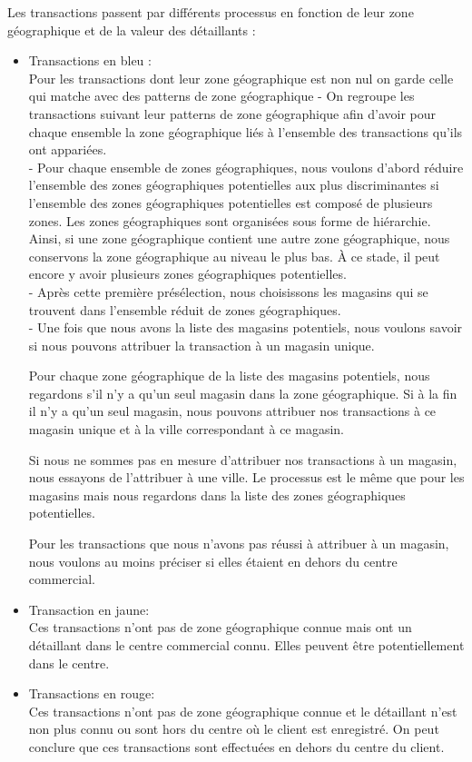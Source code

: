 \begin{itemize}
 Les transactions passent par différents processus en fonction de leur zone géographique et de la valeur des détaillants :
\begin{itemize}
\item Transactions en bleu : \\
Pour les transactions dont leur zone géographique est non nul on garde celle qui matche avec des patterns de zone géographique 
    - On regroupe les transactions suivant leur patterns de zone géographique afin d'avoir pour chaque ensemble la zone géographique liés à l'ensemble des transactions qu'ils ont appariées.\\
    - Pour chaque ensemble de zones géographiques, nous voulons d'abord réduire l'ensemble des zones géographiques potentielles aux plus discriminantes si l'ensemble des zones géographiques potentielles est composé de plusieurs zones. Les zones géographiques sont organisées sous forme de hiérarchie. Ainsi, si une zone géographique contient une autre zone géographique, nous conservons la zone géographique au niveau le plus bas. À ce stade, il peut encore y avoir plusieurs zones géographiques potentielles.\\
    - Après cette première présélection, nous choisissons les magasins qui se trouvent dans l'ensemble réduit de zones géographiques.\\
    - Une fois que nous avons la liste des magasins potentiels, nous voulons savoir si nous pouvons attribuer la transaction à un magasin unique.
\newpage

Pour chaque zone géographique de la liste des magasins potentiels, nous regardons s'il n'y a qu'un seul magasin dans la zone géographique. Si à la fin il n'y a qu'un seul magasin, nous pouvons attribuer nos transactions à ce magasin unique et à la ville correspondant à ce magasin. 

        Si nous ne sommes pas en mesure d'attribuer nos transactions à un magasin, nous essayons de l'attribuer à une ville. Le processus est le même que pour les magasins mais nous regardons dans la liste des zones géographiques potentielles. 

    Pour les transactions que nous n'avons pas réussi à attribuer à un magasin, nous voulons au moins préciser si elles étaient en dehors du centre commercial. 

\item Transaction en jaune:\\
Ces transactions n’ont pas de zone géographique connue mais ont un détaillant dans le centre commercial connu. Elles peuvent être potentiellement dans le centre. 

\item Transactions en rouge:\\
Ces transactions n’ont pas de zone géographique connue et le détaillant n’est non plus connu ou sont hors du centre où le client est enregistré. On peut conclure que ces transactions sont effectuées en dehors du centre du client.

\end{itemize}
\end{itemize}
\newpage
